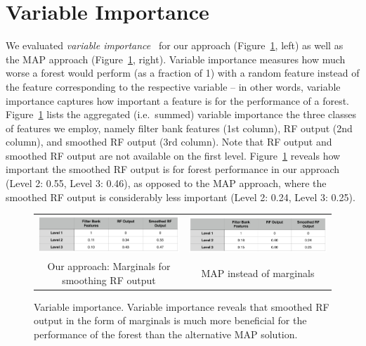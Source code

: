 \documentclass[10pt,twocolumn,letterpaper]{article}
\begin{document}
\section{Variable Importance}
We evaluated \emph{variable importance}~\cite{BreimanRF} for our approach (Figure~\ref{fig:var-importance}, left) as well as the MAP approach (Figure~\ref{fig:var-importance}, right). 
Variable importance measures how much worse a forest would perform (as a fraction of 1) with a random feature instead of the feature corresponding to the respective variable -- in other words, variable importance captures how important a feature is for the performance of a forest. 
%
Figure~\ref{fig:var-importance} lists the aggregated (i.e.\ summed) variable importance the three classes of features we employ, namely filter bank features (1st column), RF output (2nd column), and smoothed RF output (3rd column). Note that RF output and smoothed RF output are not available on the first level. 
%
Figure~\ref{fig:var-importance} reveals how important the smoothed RF output is for forest performance in our approach (Level 2: 0.55, Level 3: 0.46), as opposed to the MAP approach, where the smoothed RF output is considerably less important (Level 2: 0.24, Level 3: 0.25). 
%
%
\begin{figure}[h!]
\begin{center}
\begin{tabular}{cc}
\includegraphics[width=\columnwidth]{VariableImportance_Ours.jpg} &
\includegraphics[width=\columnwidth]{VariableImportance_MAP.jpg} \\
Our approach: Marginals for smoothing RF output & MAP instead of marginals \\
\end{tabular}
\caption{Variable importance. Variable importance reveals that smoothed RF output in the form of marginals is much more beneficial for the performance of the forest than the alternative MAP solution. }
\label{fig:var-importance}
\end{center}
\end{figure}
\end{document}
